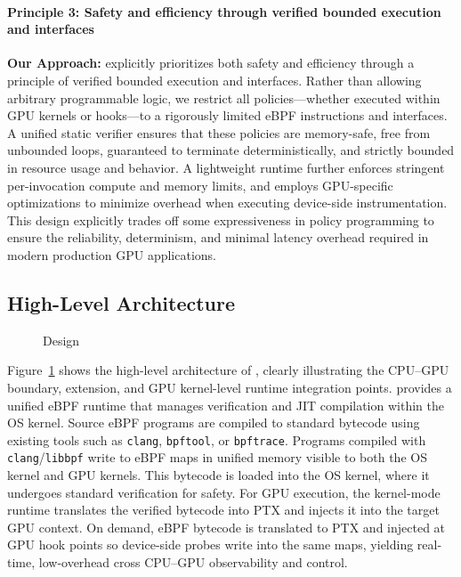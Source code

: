 \paragraph{Principle 3: Safety and efficiency through verified bounded execution and interfaces}
\noindent\textbf{Our Approach:} \sys explicitly prioritizes both safety and efficiency through a principle of verified bounded execution and interfaces. Rather than allowing arbitrary programmable logic, we restrict all policies—whether executed within GPU kernels or \sysdriver hooks—to a rigorously limited eBPF instructions and interfaces. A unified static verifier ensures that these policies are memory-safe, free from unbounded loops, guaranteed to terminate deterministically, and strictly bounded in resource usage and behavior. A lightweight runtime further enforces stringent per-invocation compute and memory limits, and employs GPU-specific optimizations to minimize overhead when executing device-side instrumentation. This design explicitly trades off some expressiveness in policy programming to ensure the reliability, determinism, and minimal latency overhead required in modern production GPU applications.

\subsection{High-Level Architecture}

\begin{figure}
\centering
{}
\vspace{-.5ex}
\caption{\sys Design}
\label{fig:system-design}
\end{figure}

Figure~\ref{fig:system-design} shows the high-level architecture of \sys, clearly illustrating the CPU--GPU boundary, \sysdriver extension, and GPU kernel-level runtime integration points. \sys provides a unified eBPF runtime that manages verification and JIT compilation within the OS kernel. Source eBPF programs are compiled to standard bytecode using existing tools such as \texttt{clang}, \texttt{bpftool}, or \texttt{bpftrace}. Programs compiled with \texttt{clang}/\texttt{libbpf} write to eBPF maps in unified memory visible to both the OS kernel and GPU kernels. This bytecode is loaded into the OS kernel, where it undergoes standard verification for safety. For GPU execution, the kernel-mode runtime translates the verified bytecode into PTX and injects it into the target GPU context. On demand, eBPF bytecode is translated to PTX and injected at GPU hook points so device-side probes write into the same maps, yielding real-time, low-overhead cross CPU--GPU observability and control.

